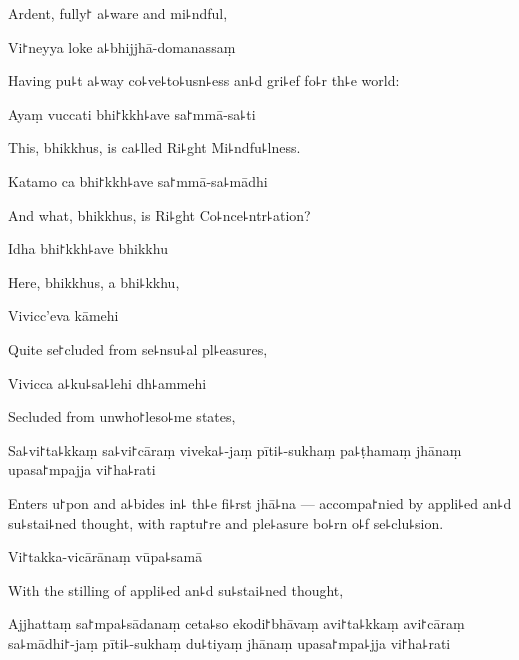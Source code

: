 \begin{english}
  Ardent, fully꜓ a꜕ware and mi꜕ndful,
\end{english}

Vi꜓neyya loke a꜕bhijjhā-domanassaṃ

\begin{english}
  Having pu꜕t a꜕way co꜕ve꜕to꜕usn꜕ess an꜕d gri꜕ef fo꜕r th꜕e world:
\end{english}

Ayaṃ vuccati bhi꜓kkh꜕ave sa꜓mmā-sa꜕ti

\begin{english}
  This, bhikkhus, is ca꜕lled Ri꜕ght Mi꜕ndfu꜕lness.
\end{english}

\ifaivedition
\clearpage
\fi

Katamo ca bhi꜓kkh꜕ave sa꜓mmā-sa꜕mādhi

\begin{english}
  And what, bhikkhus, is Ri꜕ght Co꜕nce꜕ntr꜕ation?
\end{english}

Idha bhi꜓kkh꜕ave bhikkhu

\begin{english}
  Here, bhikkhus, a bhi꜕kkhu,
\end{english}

Vivicc'eva kāmehi

\begin{english}
  Quite se꜓cluded from se꜕nsu꜕al pl꜕easures,
\end{english}

Vivicca a꜕ku꜕sa꜕lehi dh꜕ammehi

\begin{english}
  Secluded from unwho꜓leso꜕me states,
\end{english}

Sa꜕vi꜓ta꜕kkaṃ sa꜕vi꜓cāraṃ viveka꜕-jaṃ pīti꜕-sukhaṃ pa꜕ṭhamaṃ jhānaṃ upasa꜓mpajja vi꜓ha꜕rati

\begin{english}
  Enters u꜓pon and a꜕bides in꜕ th꜕e fi꜕rst jhā꜕na --- accompa꜓nied by
  appli꜕ed an꜕d su꜕stai꜕ned thought, with raptu꜓re and ple꜕asure bo꜕rn
  o꜕f se꜕clu꜕sion.
\end{english}

Vi꜓takka-vicārānaṃ vūpa꜕samā

\begin{english}
  With the stilling of appli꜕ed an꜕d su꜕stai꜕ned thought,
\end{english}

Ajjhattaṃ sa꜓mpa꜕sādanaṃ ceta꜕so ekodi꜓bhāvaṃ avi꜓ta꜕kkaṃ avi꜓cāraṃ sa꜕mādhi꜓-jaṃ pīti꜕-sukhaṃ du꜕tiyaṃ jhānaṃ upasa꜓mpa꜕jja vi꜓ha꜕rati

